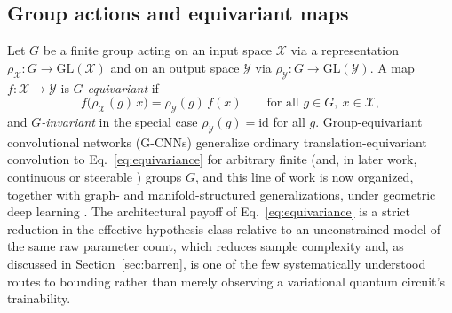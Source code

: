 \documentclass[11pt]{article}
\begin{document}
\subsection{Group actions and equivariant maps}
Let $G$ be a finite group acting on an input space $\mathcal{X}$ via a representation $\rho_{\mathcal{X}}:G\to\mathrm{GL}(\mathcal{X})$ and on an output space $\mathcal{Y}$ via $\rho_{\mathcal{Y}}:G\to\mathrm{GL}(\mathcal{Y})$. A map $f:\mathcal{X}\to\mathcal{Y}$ is \emph{$G$-equivariant} if
\begin{equation}
f\bigl(\rho_{\mathcal{X}}(g)\,x\bigr) = \rho_{\mathcal{Y}}(g)\, f(x) \qquad \text{for all } g\in G,\ x\in\mathcal{X},
\label{eq:equivariance}
\end{equation}
and \emph{$G$-invariant} in the special case $\rho_{\mathcal{Y}}(g)=\mathrm{id}$ for all $g$. Group-equivariant convolutional networks (G-CNNs) \cite{Cohen2016} generalize ordinary translation-equivariant convolution to Eq.~\eqref{eq:equivariance} for arbitrary finite (and, in later work, continuous or steerable \cite{Weiler2019}) groups $G$, and this line of work is now organized, together with graph- and manifold-structured generalizations, under geometric deep learning \cite{Bronstein2021}. The architectural payoff of Eq.~\eqref{eq:equivariance} is a strict reduction in the effective hypothesis class relative to an unconstrained model of the same raw parameter count, which reduces sample complexity and, as discussed in Section~\ref{sec:barren}, is one of the few systematically understood routes to bounding rather than merely observing a variational quantum circuit's trainability.
\end{document}
